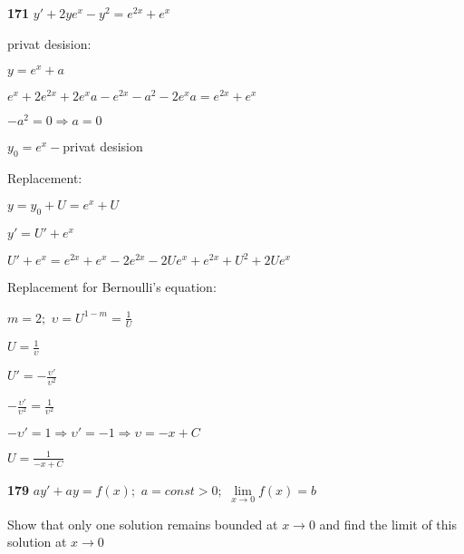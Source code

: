 \documentclass{article}
\begin{document}
\begin{flushleft}
{\bf 171 } $y'+2ye^x-y^2=e^{2x}+e^x$

\end{flushleft}
privat desision:
\begin{left}
\begin{spacing}{1.5}
$y=e^x+a$

$e^x+2e^{2x}+2e^xa-e^{2x}-a^2-2e^xa=e^{2x}+e^x$

$-a^2=0 \Rightarrow a=0$

$y_0=e^x - $privat desision
\end{spacing}
\end{left}
Replacement:
\begin{left}
\begin{spacing}{1.5}
$y=y_0+U=e^x+U$

$y'=U'+e^x$

$U'+e^x=e^{2x}+e^x-2e^{2x}-2Ue^x+e^{2x}+U^2+2Ue^x$

\end{spacing}
\end{left}
Replacement for Bernoulli's equation:
\begin{left}
\begin{spacing}{1.8}
$m=2; $ $\displaystyle \upsilon=U^{1-m}=\frac{1}{U}$

$\displaystyle U=\frac{1}{\upsilon}$

$\displaystyle U'=-\frac{\upsilon'}{\upsilon^2}$

$\displaystyle -\frac{\upsilon'}{\upsilon^2}=\frac{1}{\upsilon^2}$

$-\upsilon'=1 \Rightarrow \upsilon'=-1 \Rightarrow \upsilon=-x+C$

$\displaystyle U=\frac{1}{-x+C}$

\end{spacing}
\end{left}

\begin{flushleft}
{\bf 179 } $ay'+ay=f(x); $ $a=const>0; $ $\lim\limits_{x \to 0} f(x) = b$

\end{flushleft}
Show that only one solution remains bounded at $x \rightarrow 0$ and find the limit of this solution at $x \rightarrow 0$
\end{document}
